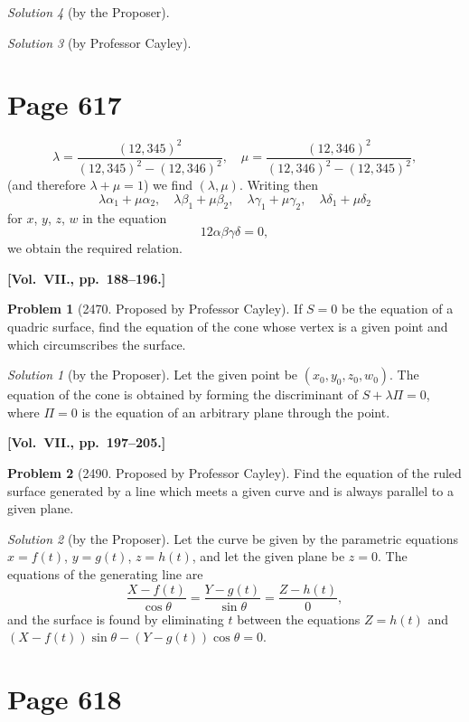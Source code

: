 \documentclass[12pt,a4paper]{article}
\theoremstyle{plain}
\theoremstyle{definition}
\newtheorem{problem}{Problem}
\theoremstyle{remark}
\newtheorem*{solution}{Solution}
\begin{document}
\begin{solution}[by the Proposer]
\begin{solution}[by Professor Cayley]
\section*{Page 617}
\setcounter{page}{617}

\[
\lambda = \frac{(12, 345)^2}{(12, 345)^2 - (12, 346)^2}, \quad
\mu = \frac{(12, 346)^2}{(12, 346)^2 - (12, 345)^2},
\]
(and therefore $\lambda + \mu = 1$) we find $(\lambda, \mu)$. Writing then
\[
\lambda \alpha_1 + \mu \alpha_2, \quad
\lambda \beta_1 + \mu \beta_2, \quad
\lambda \gamma_1 + \mu \gamma_2, \quad
\lambda \delta_1 + \mu \delta_2
\]
for $x$, $y$, $z$, $w$ in the equation
\[
12\alpha\beta\gamma\delta = 0,
\]
we obtain the required relation.

\medskip\noindent\textbf{[Vol.~VII., pp.~188--196.]}

\begin{problem}[2470. Proposed by Professor Cayley]
If $S = 0$ be the equation of a quadric surface, find the equation of the cone whose vertex is a given point and which circumscribes the surface.
\end{problem}

\begin{solution}[by the Proposer]
Let the given point be $(x_0, y_0, z_0, w_0)$. The equation of the cone is obtained by forming the discriminant of $S + \lambda\Pi = 0$, where $\Pi = 0$ is the equation of an arbitrary plane through the point.
\end{solution}

\medskip\noindent\textbf{[Vol.~VII., pp.~197--205.]}

\begin{problem}[2490. Proposed by Professor Cayley]
Find the equation of the ruled surface generated by a line which meets a given curve and is always parallel to a given plane.
\end{problem}

\begin{solution}[by the Proposer]
Let the curve be given by the parametric equations $x = f(t)$, $y = g(t)$, $z = h(t)$, and let the given plane be $z = 0$. The equations of the generating line are
\[
\frac{X - f(t)}{\cos\theta} = \frac{Y - g(t)}{\sin\theta} = \frac{Z - h(t)}{0},
\]
and the surface is found by eliminating $t$ between the equations $Z = h(t)$ and $(X - f(t))\sin\theta - (Y - g(t))\cos\theta = 0$.
\end{solution}

\section*{Page 618}
\setcounter{page}{618}


\end{solution}
\end{solution}
\end{document}
